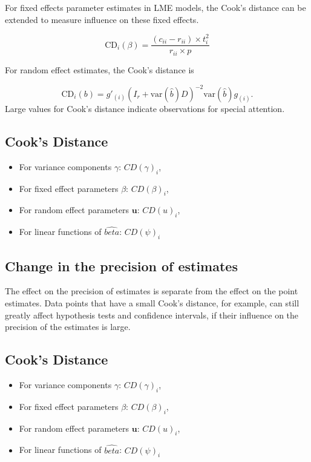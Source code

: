 \documentclass[12pt, a4paper]{article}
\begin{document}
For fixed effects parameter estimates in LME models, the  Cook's distance can be extended to measure influence on these fixed effects.

\[
\mbox{CD}_{i}(\beta) = \frac{(c_{ii} - r_{ii}) \times t^2_{i}}{r_{ii} \times p}
\]

For random effect estimates, the  Cook's distance is

\[
\mbox{CD}_{i}(b) = g{\prime}_{(i)} (I_{r} + \mbox{var}(\hat{b})D)^{-2}\mbox{var}(\hat{b})g_{(i)}.
\]
Large values for Cook's distance indicate observations for special attention.

\subsection{Cook's Distance}
\begin{itemize}
	\item For variance components $\gamma$: $CD(\gamma)_i$,
	\item For fixed effect parameters $\beta$: $CD(\beta)_i$,
	\item For random effect parameters $\boldsymbol{u}$: $CD(u)_i$,
	\item For linear functions of $\hat{beta}$: $CD(\psi)_i$
\end{itemize}





\subsection{Change in the precision of estimates}

The effect on the precision of estimates is separate from the effect on the point estimates. Data points that
have a small Cook's distance, for example, can still greatly affect hypothesis tests and confidence intervals, if their  influence on the precision of the estimates is large.


\subsection{Cook's Distance}
\begin{itemize}
	\item For variance components $\gamma$: $CD(\gamma)_i$,
	\item For fixed effect parameters $\beta$: $CD(\beta)_i$,
	\item For random effect parameters $\boldsymbol{u}$: $CD(u)_i$,
	\item For linear functions of $\hat{beta}$: $CD(\psi)_i$
\end{itemize}
\end{document}
